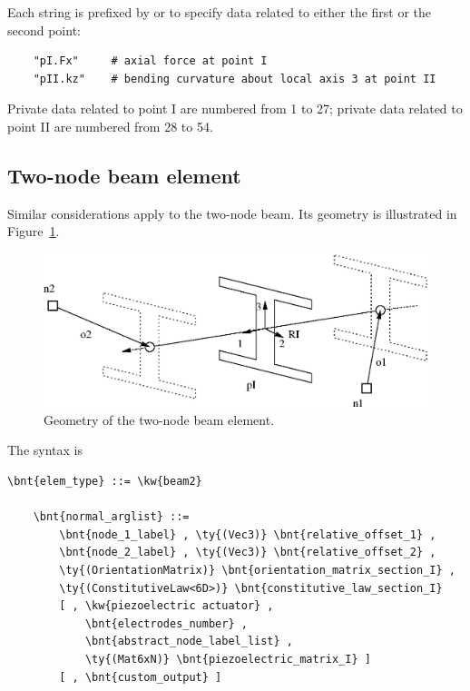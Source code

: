 Each string is prefixed by  or 
to specify data related to either the first or the second point:
\begin{verbatim}
    "pI.Fx"     # axial force at point I
    "pII.kz"    # bending curvature about local axis 3 at point II
\end{verbatim}
Private data related to point I are numbered from 1 to 27;
private data related to point II are numbered from 28 to 54.








\subsection{Two-node beam element}
\label{sec:EL:BEAM:BEAM2}
Similar considerations apply to the two-node beam.
Its geometry is illustrated in Figure~\ref{fig:EL:BEAM:beam2}.

\begin{figure}
\centering
{}
\includegraphics[width=.7\textwidth]{beam2}
\caption{Geometry of the two-node beam element.}
\label{fig:EL:BEAM:beam2}
\end{figure}

The syntax is
\begin{Verbatim}[commandchars=\\\{\}]
    \bnt{elem_type} ::= \kw{beam2}

    \bnt{normal_arglist} ::=
        \bnt{node_1_label} , \ty{(Vec3)} \bnt{relative_offset_1} ,
        \bnt{node_2_label} , \ty{(Vec3)} \bnt{relative_offset_2} ,
        \ty{(OrientationMatrix)} \bnt{orientation_matrix_section_I} ,
        \ty{(ConstitutiveLaw<6D>)} \bnt{constitutive_law_section_I}
        [ , \kw{piezoelectric actuator} , 
            \bnt{electrodes_number} ,
            \bnt{abstract_node_label_list} ,
            \ty{(Mat6xN)} \bnt{piezoelectric_matrix_I} ]
        [ , \bnt{custom_output} ]
\end{Verbatim}

